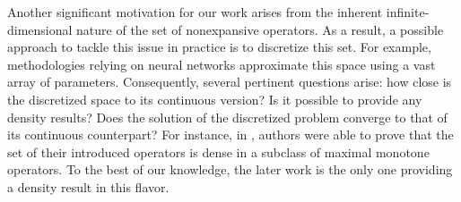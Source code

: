 \documentclass[onefignum,onetabnum]{siamonline250211}
\begin{document}
Another significant motivation for our work arises from the inherent infinite-dimensional nature of the set of nonexpansive operators. As a result, a possible approach to tackle this issue in practice is to discretize this set. For example, methodologies relying on neural networks approximate this space using a vast array of parameters. Consequently, several pertinent questions arise: how close is the discretized space to its continuous version? Is it possible to provide any density results? Does the solution of the discretized problem converge to that of its continuous counterpart? For instance, in \cite{pescterr2021}, authors were able to prove that the set of their introduced operators is dense in a subclass of maximal monotone operators. To the best of our knowledge, the later work is the only one providing a density result in this flavor.
\end{document}
